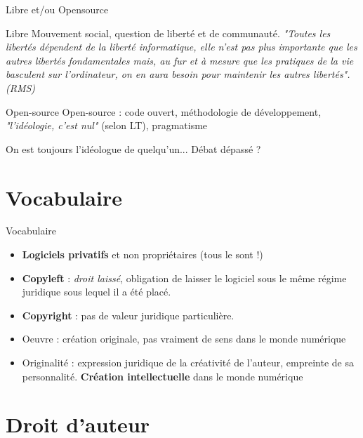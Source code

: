\documentclass{beamer}
\begin{document}


\begin{frame}{Libre et/ou Opensource}

  \begin{block}{Libre}
    Mouvement social, question de liberté et de communauté. \textit{"Toutes les libertés dépendent de la liberté informatique, elle n’est pas plus importante que les autres libertés fondamentales mais, au fur et à mesure que les pratiques de la vie basculent sur l’ordinateur, on en aura besoin pour maintenir les autres libertés". (RMS)}
  \end{block}

  \begin{block}{Open-source}
    Open-source : code ouvert, méthodologie de développement, \textit{"l'idéologie, c'est nul"} (selon LT), pragmatisme
  \end{block}

On est toujours l'idéologue de quelqu'un... Débat dépassé ?
\end{frame}

\section{Vocabulaire}

\begin{frame}{Vocabulaire}

  \begin{itemize}
  \item \textbf{Logiciels privatifs} et non propriétaires (tous le sont !)
  \item \textbf{Copyleft} : \textit{droit laissé}, obligation de laisser le logiciel sous le même régime juridique sous lequel il a été placé.
  \item \textbf{Copyright} : pas de valeur juridique particulière. 
  \item Oeuvre : création originale, pas vraiment de sens dans le monde numérique
  \item Originalité : expression juridique de la créativité de l'auteur, empreinte de sa personnalité. \textbf{Création intellectuelle} dans le monde numérique
  \end{itemize}
\end{frame}

\section{Droit d'auteur}
\end{document}
